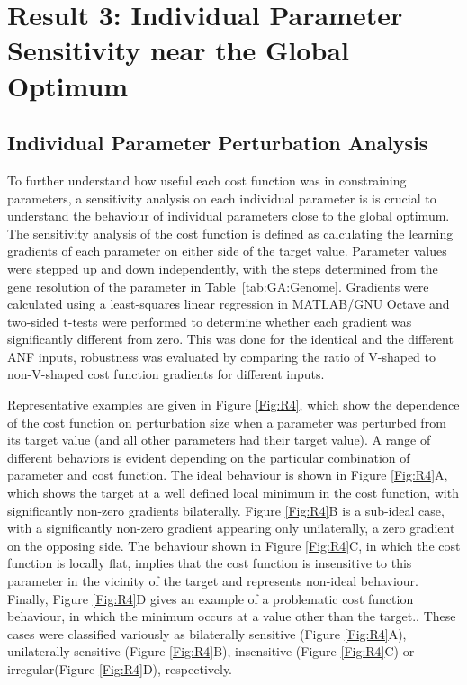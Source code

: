 \section{Result 3: Individual Parameter Sensitivity near the Global Optimum}\label{sec:GA:IndividualSensA}


\subsection{Individual Parameter Perturbation Analysis}

To further understand how useful each cost function was in
constraining parameters, a sensitivity analysis on each individual
parameter is is crucial to understand the behaviour of individual
parameters close to the global optimum.  The sensitivity analysis of
the cost function is defined as calculating the learning gradients of
each parameter on either side of the target value. Parameter values
were stepped up and down independently, with the steps determined from
the gene resolution of the parameter in
Table~\ref{tab:GA:Genome}. Gradients were calculated using a
least-squares linear regression in MATLAB/GNU Octave and two-sided
t-tests were performed to determine whether each gradient was
significantly different from zero.  This was done for the identical
and the different ANF inputs, robustness was evaluated by comparing
the ratio of V-shaped to non-V-shaped cost function gradients for
different inputs.

\medskip{}

Representative examples are given in Figure \ref{Fig:R4}, which show
the dependence of the cost function on perturbation size when a parameter was
perturbed from its target value (and all other parameters had their target
value). A range of different behaviors is evident depending on the particular
combination of parameter and cost function. The ideal behaviour is shown in
Figure \ref{Fig:R4}A, which shows the target at a well defined local minimum in
the cost function, with significantly non-zero gradients bilaterally. Figure
\ref{Fig:R4}B is a sub-ideal case, with a significantly non-zero gradient
appearing only unilaterally, a zero gradient on the opposing side.  The
behaviour shown in Figure \ref{Fig:R4}C, in which the cost function is locally
flat, implies that the cost function is insensitive to this parameter in the
vicinity of the target and represents non-ideal behaviour. Finally, Figure
\ref{Fig:R4}D gives an example of a problematic cost function behaviour, in
which the minimum occurs at a value other than the target.. These cases were classified variously as
bilaterally sensitive (Figure \ref{Fig:R4}A), unilaterally sensitive (Figure
\ref{Fig:R4}B), insensitive (Figure \ref{Fig:R4}C) or irregular(Figure
\ref{Fig:R4}D), respectively.

